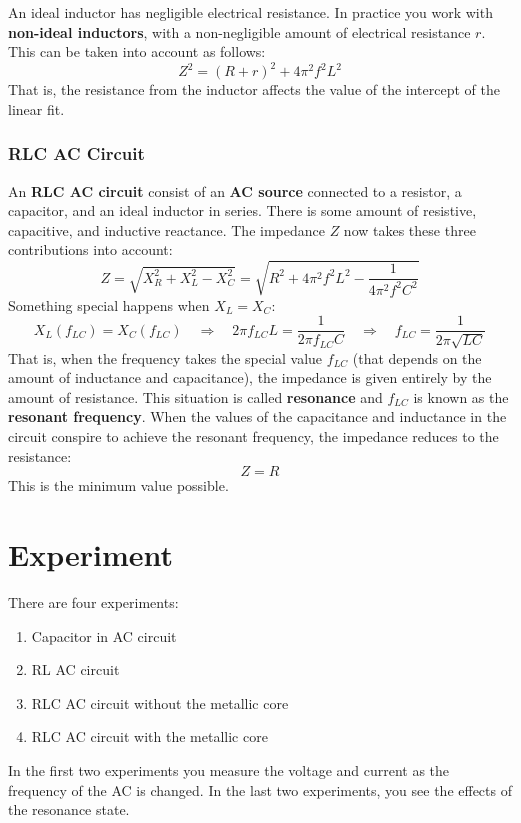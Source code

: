 An ideal inductor has negligible electrical resistance. In practice you work with \textbf{non-ideal inductors}, with a non-negligible amount of electrical resistance $r$. This can be taken into account as follows:
\begin{equation}
	Z^{2} = (R + r)^{2} + 4 \pi^{2} f^{2} L^{2}
\end{equation}
That is, the resistance from the inductor affects the value of the intercept of the linear fit.
\subsubsection{RLC AC Circuit}
An \textbf{RLC AC circuit} consist of an \textbf{AC source} connected to a resistor, a capacitor, and an ideal inductor in series. There is some amount of resistive, capacitive, and inductive reactance. The impedance $Z$ now takes these three contributions into account:
\begin{equation} \label{eq.06.eq.06.impedance.RLC}
	Z = \sqrt{X_{R}^{2} + X_{L}^{2} - X_{C}^{2}} = \sqrt{R^{2} + 4 \pi^{2} f^{2} L^{2} - \frac{1}{4 \pi^{2} f^{2} C^{2}}}
\end{equation}
Something special happens when $X_{L} = X_{C}$:
\begin{equation} \label{eq.06.resonant.frequency}
	X_{L}(f_{LC}) = X_{C}(f_{LC}) \quad \Longrightarrow \quad 2\pi f_{LC} L = \frac{1}{2\pi f_{LC} C} \quad \Longrightarrow \quad f_{LC} = \frac{1}{2 \pi \sqrt{LC}}
\end{equation}
That is, when the frequency takes the special value $f_{LC}$ (that depends on the amount of inductance and capacitance), the impedance is given entirely by the amount of resistance. This situation is called \textbf{resonance} and $f_{LC}$ is known as the \textbf{resonant frequency}. When the values of the capacitance and inductance in the circuit conspire to achieve the resonant frequency, the impedance reduces to the resistance:
\begin{equation}
	Z = R
\end{equation}
This is the minimum value possible.
\section{Experiment}
There are four experiments:
\begin{enumerate}
	\item Capacitor in AC circuit
	\item RL AC circuit
	\item RLC AC circuit without the metallic core
	\item RLC AC circuit with the metallic core
\end{enumerate}
In the first two experiments you measure the voltage and current as the frequency of the AC is changed. In the last two experiments, you see the effects of the resonance state.
